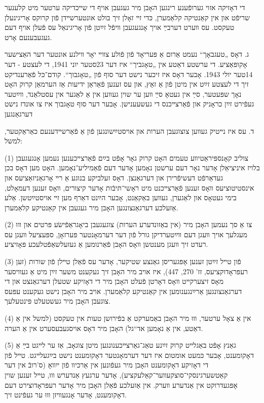 \documentclass{article}
\begin{document}
\begin{pairs}
\begin{Rightside}
\begin{RTL}
\begin{hebrew}
די דאָזיקה אזוי גערופֿענע רינגען האָבן מיר געגעבן אויף די שײכדיקה ערטער מיט קלענער
שריפֿט און אין קאַנטיקה קלאַמערן, כּדי זײ זאָלן זיך בולט
אונטערשײדן פֿון קרוקס אָריגינעלן טעקסט. עס װערט דערבײַ אויך אָנגעגעבן
װיפֿל זײַטן פֿון אָריגינאַל עס פֿעלן אויף דעם געגעבענעם אָרט.

ג. דאָס „טעגבאָך“ נעמט אַרום אַ פּעריאָד פֿון פֿולע צװײ יאָר װילנע אונטער
דער האַצישער אָקופּאַציע. די ערשטע דאַטע אין „טאָגביך“ איז דער 23סטער יוני
1941, די לעצטע - דער 14טער יולי 1943. אָבער דאָס איז זיכער נישט דער
סוף פֿון „טאָגבוך“. קודם־כּל פֿאַרענדיקט זיך די לעצטע זײַט אין מיטן פֿון אַ זאַץ,
און עס זענען פֿאַראַן ידיעות אַז הערמאַן קרוק האָט נאָך שפּעטער, סײַ אין
געטאָ סײַ װען ער שוין געװען אין אַ לאַגער אין עסטלאַנד, װײַטער געפֿירט
זײַן כראָניק און פֿאַרצײכנס די געשעענישן. אָבער דער סוף טאָגבוך איז צו
אונדז נישט דערגאַנגען

ד. עס איז נײטיק געװען צוצוגעבן הערות און אויסטײַשונגען פֿון אַ פֿאַרשײדענעם כאַראַקטער, למשל:


 (1) צוליב קאָנספּיראַטיװע טעמים האָט קרוק גאָר אָפֿט בײַם פֿאַרצײכענען
 נעמען אָנגעגעבן בלויז איניציאַלן אָדער נאָר דעם ערשטן נאָמען
 אָדער דעם פֿאַמיליע־נאָמען. האָט מען דאָס בכן געדאַרפֿט דעשיפֿרירן
 און דערגאַנצן. דאָס זעלביקע בנוגע אַ רײ אָרגאַניזאַציעס און אינסטיטוציעס װאָס זענען
 פֿאַרצײכנט מיט ראָשי־תּיבֿות אָדער קיצורים, װאָס
 זענען דעמאָלט, בימי געטאָס און לאַגערן, געװען באַקאַנט, אָבער הײַנט
 דאַרף מען זײ אויסטײַטשן. אַלע אַזעלכע דערגאַנצונגען האָבן מיר געגעבן
 אין קאַנטיקע קלאַמערן.

(2)
צו אַ סך נעמען האָבן מיר (אין באַזונדערע הערות) צוגעגעבן
ביאָגראַפֿישׂע פּרטים און װוּ מעגלעך אויך װעגן דעם װײַטערדיקן גורל
פֿון דער דערמאָנטער פּערזאָן, ספּעציעל װעגן עס רעדט  זיך װעגן מענטשן
װאָס האָבן פֿאַרנומען אַ געזעלשאַפֿטלעכע פּאָזיציע.

(3)
פֿון טײל זײַטן זענען אָפּגעריסן גאַנצע שטיקער, אָדער עס פֿאַלן
טײלן פֿון שורות (זען רעפּראָדוקציעס, זז' 270, 447), איז אויב מיר האָבן
זיך געקענט משער זײַן מיט אַ געװיסער מאָס זיצערקײט װאָס דאָרטן פֿעלט
האָבן מיר די דאָזיקע שטעלן דערגאַנצט און די דערגאַנצונגען אַרײַנגענומען
אין קאַנטיקע קלאַמערן. אויב מיר האָבן נישט געקענט עפּעס צוגעבן
האָבן מיר געשטעלט פּינטעלעך.

(4)
אין אַ צאָל ערטער, װוּ מיר האָבן באַמערקט אַ בפֿירושן טעות
אין טעקסט (למשל אין אַ דאַטע, אין אַ נאָמען אד“גל) האָבן מיר דאָס
אויסגעבעסערט אין אַ הערה.

(5)
גאַנץ אָפֿט באַגלײט קרוק זײַנע טאַג־גאַרצײכענונגען מיטן צוגאָב,
אַז ער לײגט בײַ אַ דאָקומענט, אָבער כּמעט אומטום איז דער
 דערמאָנטער דאָקומענט נישט בײַגעלײגט. טײל פֿון די דאָזיקע 
 דאָקומענט האָבן מיר געפֿונען אין אַרכיװ פֿון ייִװאָ (ס'רובֿ אין דער
  קאַטשערגינסקי־סוצקעװער־קאַלעקציע), אָדער ערגעץ אַנדערש װוּ, טײל זענען
  שוין אָפּגעדרוקט אין אַנדערע װערק. אין אַזעלכע פֿאַלן האָבן מיר אָדער
  רעפּראָדוצירט דעם דאָקומענט, אָדער אָנגעװיזן װוּ ער געפֿינט זיך.


\end{hebrew}
\end{RTL}
\end{Rightside}
\end{pairs}
\end{document}
